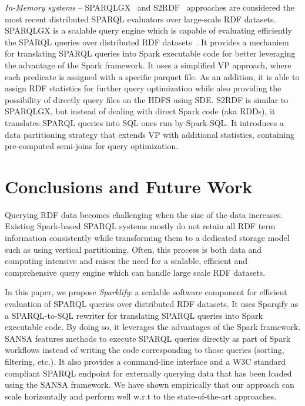 \textit{In-Memory systems} --
SPARQLGX~\cite{sparqlgx-iswc-2016} and S2RDF~\cite{Schatzle:2016:SRQ:2977797.2977806} approaches are considered the most recent distributed SPARQL evaluators over large-scale RDF datasets.
SPARQLGX is a scalable query engine which is capable of evaluating efficiently the SPARQL queries over distributed RDF datasets~\cite{graux2018multi}.
It provides a mechanism for translating SPARQL queries into Spark executable code for better leveraging the advantage of the Spark framework.
It uses a simplified VP approach, where each predicate is assigned with a specific parquet file.
As an addition, it is able to assign RDF statistics for further query optimization while also providing the possibility of directly query files on the HDFS using SDE.
S2RDF is similar to SPARQLGX, but instead of dealing with direct Spark code (aka RDDs), it translates SPARQL queries into SQL ones run by Spark-SQL.
It introduces a data partitioning strategy that extends VP with additional statistics, containing pre-computed semi-joins for query optimization.


\section{Conclusions and Future Work}
\label{sec:conclusion}
Querying RDF data becomes challenging when the size of the data increases.
Existing Spark-based SPARQL systems mostly
do not retain all RDF term information consistently while transforming them to a dedicated storage model such as using vertical partitioning.
Often, this process is both data and computing intensive and raises the need for a scalable, efficient and comprehensive query engine which can handle large scale RDF datasets.

In this paper, we propose \emph{Sparklify}: a scalable software component for efficient evaluation of SPARQL queries over distributed RDF datasets.
It uses Sparqify as a SPARQL-to-SQL rewriter for translating SPARQL queries into Spark executable code.
By doing so, it leverages the advantages of the Spark framework.
SANSA features methods to execute SPARQL queries directly as part of Spark workflows instead of writing the code corresponding to those queries (sorting, filtering, etc.).
It also provides a command-line interface and a W3C standard compliant SPARQL endpoint for externally querying data that has been loaded using the SANSA framework.
We have shown empirically that our approach can scale horizontally and perform well w.r.t to the state-of-the-art approaches.

